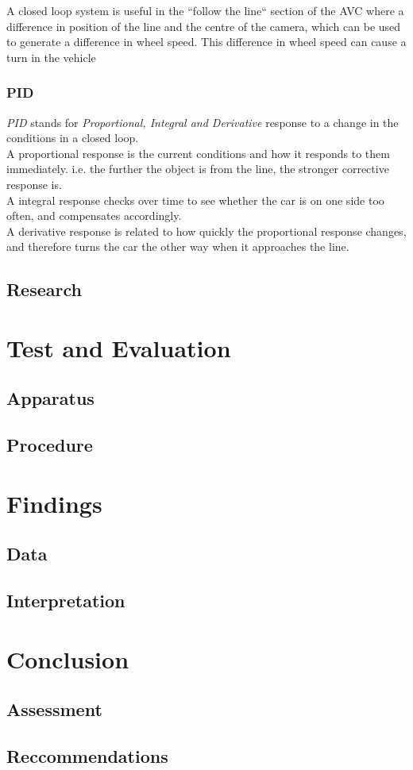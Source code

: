 \documentclass[paper=a4, fontsize=11pt]{scrartcl} %
\numberwithin{equation}{section} %
\numberwithin{figure}{section} %
\begin{document}
A closed loop system is useful in the ``follow the line`` section of the AVC
where a difference in position of the line and the centre of the camera, which
can be used to generate a difference in wheel speed. This difference in wheel
speed can cause a turn in the vehicle

\subsubsection{PID}
\textit{PID} stands for \textit{Proportional, Integral and Derivative} response
to a change in the conditions in a closed loop.\\
A proportional response is the current conditions and how it responds to them
immediately. i.e. the further the object is from the line, the stronger
corrective response is.\\
A integral response checks over time to see whether the car is on one side too
often, and compensates accordingly.\\
A derivative response is related to how quickly the proportional response
changes, and therefore turns the car the other way when it approaches the line.
\subsection{Research}
\section{Test and Evaluation}
\subsection{Apparatus}
\subsection{Procedure}
\section{Findings}
\subsection{Data}
\subsection{Interpretation}
\section{Conclusion}
\subsection{Assessment}
\subsection{Reccommendations}

\printbibliography
\end{document}
